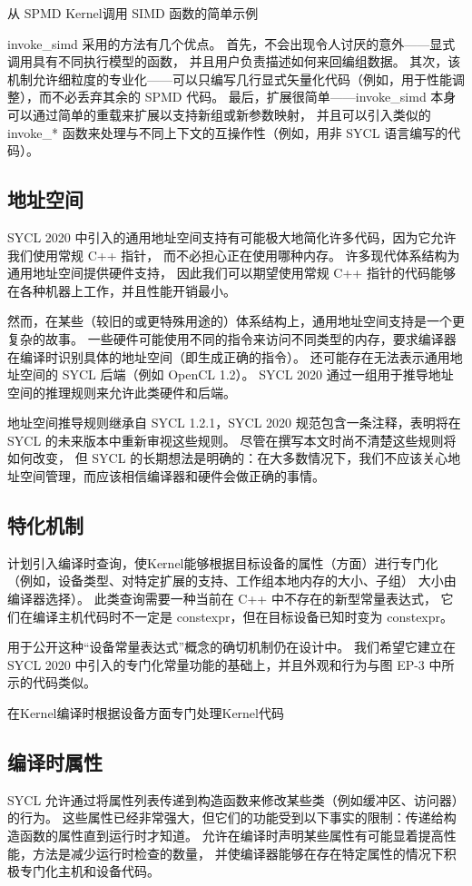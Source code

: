 {\color{red} 从 SPMD Kernel调用 SIMD 函数的简单示例}

invoke\_simd 采用的方法有几个优点。 首先，不会出现令人讨厌的意外——显式调用具有不同执行模型的函数，
并且用户负责描述如何来回编组数据。 
其次，该机制允许细粒度的专业化——可以只编写几行显式矢量化代码（例如，用于性能调整），而不必丢弃其余的 SPMD 代码。 
最后，扩展很简单——invoke\_simd 本身可以通过简单的重载来扩展以支持新组或新参数映射，
并且可以引入类似的 invoke\_* 函数来处理与不同上下文的互操作性（例如，用非 SYCL 语言编写的代码）。

\subsection{地址空间}
SYCL 2020 中引入的通用地址空间支持有可能极大地简化许多代码，因为它允许我们使用常规 C++ 指针，
而不必担心正在使用哪种内存。 许多现代体系结构为通用地址空间提供硬件支持，
因此我们可以期望使用常规 C++ 指针的代码能够在各种机器上工作，并且性能开销最小。

然而，在某些（较旧的或更特殊用途的）体系结构上，通用地址空间支持是一个更复杂的故事。 
一些硬件可能使用不同的指令来访问不同类型的内存，要求编译器在编译时识别具体的地址空间（即生成正确的指令）。 
还可能存在无法表示通用地址空间的 SYCL 后端（例如 OpenCL 1.2）。 
SYCL 2020 通过一组用于推导地址空间的推理规则来允许此类硬件和后端。

地址空间推导规则继承自 SYCL 1.2.1，SYCL 2020 规范包含一条注释，表明将在 SYCL 的未来版本中重新审视这些规则。 
尽管在撰写本文时尚不清楚这些规则将如何改变，
但 SYCL 的长期想法是明确的：在大多数情况下，我们不应该关心地址空间管理，而应该相信编译器和硬件会做正确的事情。

\subsection{特化机制}
计划引入编译时查询，使Kernel能够根据目标设备的属性（方面）进行专门化
（例如，设备类型、对特定扩展的支持、工作组本地内存的大小、子组） 大小由编译器选择）。 
此类查询需要一种当前在 C++ 中不存在的新型常量表达式，
它们在编译主机代码时不一定是 constexpr，但在目标设备已知时变为 constexpr。

用于公开这种“设备常量表达式”概念的确切机制仍在设计中。 
我们希望它建立在 SYCL 2020 中引入的专门化常量功能的基础上，并且外观和行为与图 EP-3 中所示的代码类似。

{\color{red} 在Kernel编译时根据设备方面专门处理Kernel代码}

\subsection{编译时属性}
SYCL 允许通过将属性列表传递到构造函数来修改某些类（例如缓冲区、访问器）的行为。 
这些属性已经非常强大，但它们的功能受到以下事实的限制：传递给构造函数的属性直到运行时才知道。 
允许在编译时声明某些属性有可能显着提高性能，方法是减少运行时检查的数量，
并使编译器能够在存在特定属性的情况下积极专门化主机和设备代码。

